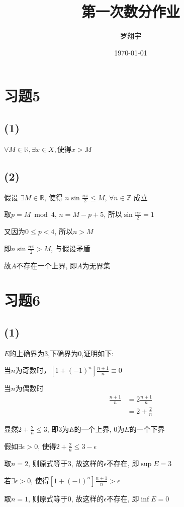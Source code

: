 \documentclass[a4paper,11pt]{article}
\title{第一次数分作业}
\author{罗翔宇}
\date{\today}
\begin{document}
\maketitle

\section{习题5}

\subsection*{(1)}

$\forall M \in \mathbb{R},\exists x \in X, $使得$x>M$
\subsection*{(2)} 

假设 $\exists M \in \mathbb{R}$, 使得 $n\sin \frac{n \pi}{2}\le M$, $\forall n \in \mathbb{Z}$ 成立

取$p=M\bmod 4$, $n=M-p+5$, 所以$\sin \frac{n\pi}{2}=1$

又因为$0\le p<4$, 所以$n>M$

即$n\sin \frac{n\pi}{2}>M$, 与假设矛盾

故$A$不存在一个上界, 即$A$为无界集
\section{习题6}
\subsection*{(1)}
$E$的上确界为$3$,下确界为$0$,证明如下:

当$n$为奇数时，$[1+(-1)^n]\frac{n+1}{n} \equiv 0$

当$n$为偶数时
\begin{align*}
	[1+(-1)^n] \frac{n+1}{n} &= 2\frac{n+1}{n}\\
				 &= 2+\frac{2}{n}
\end{align*}

显然$2+\frac{2}{n} \le 3$, 即$3$为$E$的一个上界, $0$为$E$的一个下界

假如$\exists \epsilon > 0$, 使得$2+\frac{2}{n} \le 3 - \epsilon$

取$n=2$, 则原式等于$3$, 故这样的$\epsilon$不存在, 即$\sup E=3$

若$\exists \epsilon > 0$, 使得$[1+(-1)^n] \frac{n+1}{n} > \epsilon$

取$n=1$, 则原式等于$0$, 故这样的$\epsilon$不存在, 即$\inf E=0$
\end{document}
